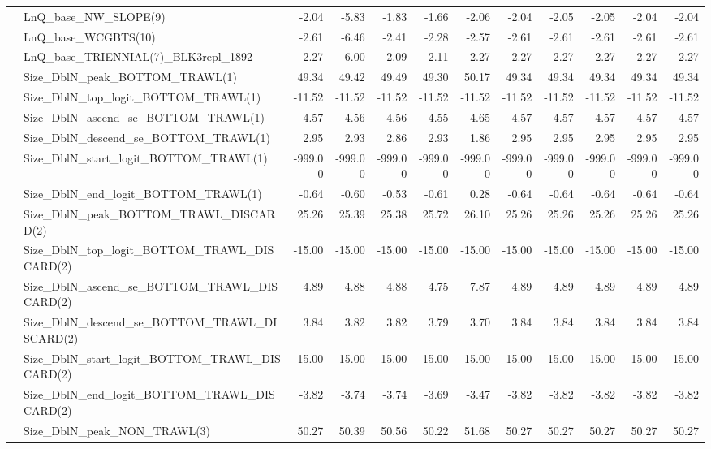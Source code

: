 \documentclass[
]{scrartcl}
\begin{document}
\begin{landscape}
\begin{longtable}{llrrrrrrrrrr}
 & LnQ\_base\_NW\_SLOPE(9) & -2.04 & -5.83 & -1.83 & -1.66 & -2.06 & -2.04 & -2.05 & -2.05 & -2.04 & -2.04 \\ 
 & LnQ\_base\_WCGBTS(10) & -2.61 & -6.46 & -2.41 & -2.28 & -2.57 & -2.61 & -2.61 & -2.61 & -2.61 & -2.61 \\ 
 & LnQ\_base\_TRIENNIAL(7)\_BLK3repl\_1892 & -2.27 & -6.00 & -2.09 & -2.11 & -2.27 & -2.27 & -2.27 & -2.27 & -2.27 & -2.27 \\ 
 & Size\_DblN\_peak\_BOTTOM\_TRAWL(1) & 49.34 & 49.42 & 49.49 & 49.30 & 50.17 & 49.34 & 49.34 & 49.34 & 49.34 & 49.34 \\ 
 & Size\_DblN\_top\_logit\_BOTTOM\_TRAWL(1) & -11.52 & -11.52 & -11.52 & -11.52 & -11.52 & -11.52 & -11.52 & -11.52 & -11.52 & -11.52 \\ 
 & Size\_DblN\_ascend\_se\_BOTTOM\_TRAWL(1) & 4.57 & 4.56 & 4.56 & 4.55 & 4.65 & 4.57 & 4.57 & 4.57 & 4.57 & 4.57 \\ 
 & Size\_DblN\_descend\_se\_BOTTOM\_TRAWL(1) & 2.95 & 2.93 & 2.86 & 2.93 & 1.86 & 2.95 & 2.95 & 2.95 & 2.95 & 2.95 \\ 
 & Size\_DblN\_start\_logit\_BOTTOM\_TRAWL(1) & -999.00 & -999.00 & -999.00 & -999.00 & -999.00 & -999.00 & -999.00 & -999.00 & -999.00 & -999.00 \\ 
 & Size\_DblN\_end\_logit\_BOTTOM\_TRAWL(1) & -0.64 & -0.60 & -0.53 & -0.61 & 0.28 & -0.64 & -0.64 & -0.64 & -0.64 & -0.64 \\ 
 & Size\_DblN\_peak\_BOTTOM\_TRAWL\_DISCARD(2) & 25.26 & 25.39 & 25.38 & 25.72 & 26.10 & 25.26 & 25.26 & 25.26 & 25.26 & 25.26 \\ 
 & Size\_DblN\_top\_logit\_BOTTOM\_TRAWL\_DISCARD(2) & -15.00 & -15.00 & -15.00 & -15.00 & -15.00 & -15.00 & -15.00 & -15.00 & -15.00 & -15.00 \\ 
 & Size\_DblN\_ascend\_se\_BOTTOM\_TRAWL\_DISCARD(2) & 4.89 & 4.88 & 4.88 & 4.75 & 7.87 & 4.89 & 4.89 & 4.89 & 4.89 & 4.89 \\ 
 & Size\_DblN\_descend\_se\_BOTTOM\_TRAWL\_DISCARD(2) & 3.84 & 3.82 & 3.82 & 3.79 & 3.70 & 3.84 & 3.84 & 3.84 & 3.84 & 3.84 \\ 
 & Size\_DblN\_start\_logit\_BOTTOM\_TRAWL\_DISCARD(2) & -15.00 & -15.00 & -15.00 & -15.00 & -15.00 & -15.00 & -15.00 & -15.00 & -15.00 & -15.00 \\ 
 & Size\_DblN\_end\_logit\_BOTTOM\_TRAWL\_DISCARD(2) & -3.82 & -3.74 & -3.74 & -3.69 & -3.47 & -3.82 & -3.82 & -3.82 & -3.82 & -3.82 \\ 
 & Size\_DblN\_peak\_NON\_TRAWL(3) & 50.27 & 50.39 & 50.56 & 50.22 & 51.68 & 50.27 & 50.27 & 50.27 & 50.27 & 50.27 \\ 

\end{longtable}
\end{landscape}
\end{document}
